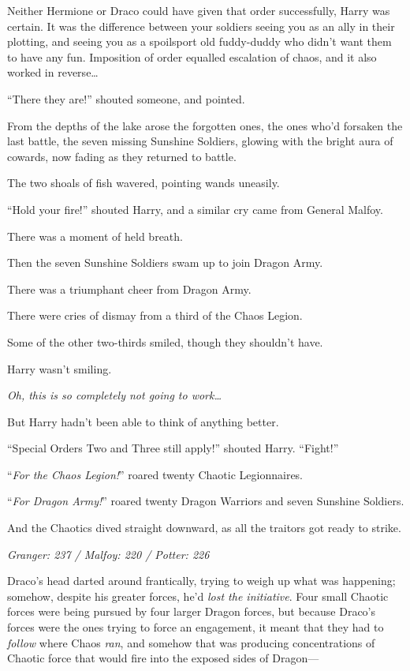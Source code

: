 Neither Hermione or Draco could have given that order successfully, Harry was certain. It was the difference between your soldiers seeing you as an ally in their plotting, and seeing you as a spoilsport old fuddy-duddy who didn’t want them to have any fun. Imposition of order equalled escalation of chaos, and it also worked in reverse…

“There they are!” shouted someone, and pointed.

From the depths of the lake arose the forgotten ones, the ones who’d forsaken the last battle, the seven missing Sunshine Soldiers, glowing with the bright aura of cowards, now fading as they returned to battle.

The two shoals of fish wavered, pointing wands uneasily.

“Hold your fire!” shouted Harry, and a similar cry came from General Malfoy.

There was a moment of held breath.

Then the seven Sunshine Soldiers swam up to join Dragon Army.

There was a triumphant cheer from Dragon Army.

There were cries of dismay from a third of the Chaos Legion.

Some of the other two-thirds smiled, though they shouldn’t have.

Harry wasn’t smiling.

\emph{Oh, this is so completely not going to work…}

But Harry hadn’t been able to think of anything better.

“Special Orders Two and Three still apply!” shouted Harry.
“Fight!”

“\emph{For the Chaos Legion!}” roared twenty Chaotic Legionnaires.

“\emph{For Dragon Army!}” roared twenty Dragon Warriors and seven Sunshine Soldiers.

And the Chaotics dived straight downward, as all the traitors got ready to strike.

\later

\emph{Granger: 237 / Malfoy: 220 / Potter: 226}

Draco’s head darted around frantically, trying to weigh up what was happening; somehow, despite his greater forces, he’d \emph{lost the initiative}. Four small Chaotic forces were being pursued by four larger Dragon forces, but because Draco’s forces were the ones trying to force an engagement, it meant that they had to \emph{follow} where Chaos \emph{ran}, and somehow that was producing concentrations of Chaotic force that would fire into the exposed sides of Dragon—

